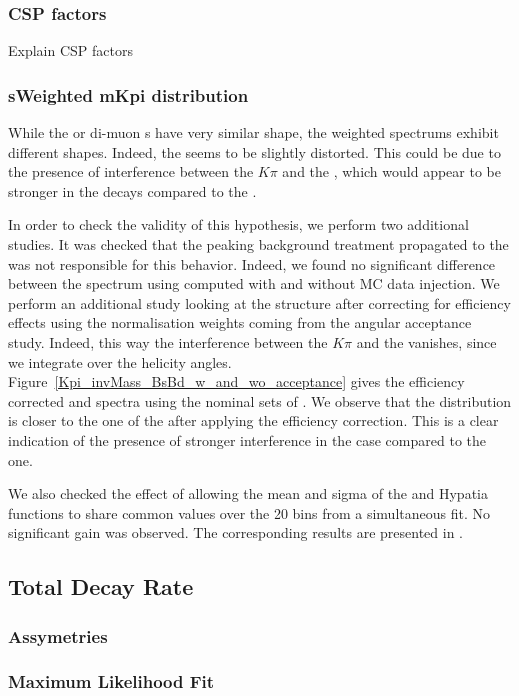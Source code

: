 \subsubsection{CSP factors}
Explain CSP factors\\

\subsubsection{sWeighted mKpi distribution}
While the \Bs or \Bd di-muon \sPlot s have very similar shape, the \mkpi weighted spectrums exhibit different shapes. 
Indeed, the \Bs \mkpi \sPlot seems to be slightly distorted. This could be due to the presence of interference between
 the $K\pi$ \swave and the \Kstarz, which would appear to be stronger in the \Bs decays compared to the \Bd. 

In order to check the validity of this hypothesis, we perform two additional studies. 
It was checked that the peaking background treatment propagated to the \sWeights was not responsible for this behavior.
Indeed, we found no significant difference between the \Bs \mkpi spectrum using \sWeights computed with and without MC 
data injection. We perform an additional study looking at the \mkpi structure after correcting for efficiency effects 
using the normalisation weights coming from the angular acceptance study. Indeed, this way the interference between the 
$K\pi$ \swave and the \Kstarz \pwave vanishes, since we integrate over the helicity angles. Figure~\ref{Kpi_invMass_BsBd_w_and_wo_acceptance}
 gives the efficiency corrected \Bs and \Bd \mkpi spectra using the nominal sets of \sWeights. We observe that the \Bs \mkpi distribution
 is closer to the one of the \Bd after applying the efficiency correction. This is a clear indication of the presence of stronger interference 
in the \Bs case compared to the \Bd one. 

We also checked the effect of allowing the mean and sigma of the \Bs and \Bd Hypatia functions to share common values over the 20 bins from
a simultaneous fit. No significant gain was observed. The corresponding results are presented in . 


\subsection{Total Decay Rate}
\label{Total_Decay_Rate}

\subsubsection{\CP Assymetries}

\subsubsection{Maximum Likelihood Fit}



